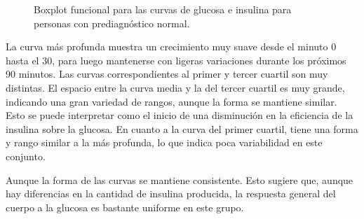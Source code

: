 \begin{figure}[H]
 \centering
    \caption{Boxplot funcional para las curvas de glucosa e insulina para personas con prediagnóstico normal.}
    \label{fig:bfNormal}
\end{figure}

La curva más profunda muestra un crecimiento muy suave desde el minuto 0 hasta el 30, para luego mantenerse con ligeras variaciones durante los próximos 90 minutos. Las curvas correspondientes al primer y tercer cuartil son muy distintas. El espacio entre la curva media y la del tercer cuartil es muy grande, indicando una gran variedad de rangos, aunque la forma se mantiene similar. Esto se puede interpretar como el inicio de una disminución en la eficiencia de la insulina sobre la glucosa. En cuanto a la curva del primer cuartil, tiene una forma y rango similar a la más profunda, lo que indica poca variabilidad en este conjunto. 

Aunque la forma de las curvas se mantiene consistente. Esto sugiere que, aunque hay diferencias en la cantidad de insulina producida, la respuesta general del cuerpo a la glucosa es bastante uniforme en este grupo.

